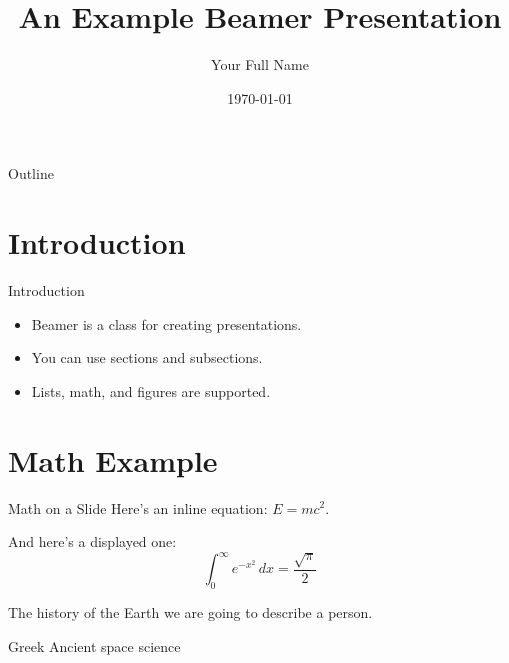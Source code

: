 \documentclass{beamer}
\title[Short Title]{An Example Beamer Presentation}
\author[Your Name]{Your Full Name}
\institute[Your School]{Pierre Elliott Trudeau High School}
\date{\today}
\begin{document}
\begin{frame}
  \titlepage
\end{frame}

\begin{frame}{Outline}
  \tableofcontents
\end{frame}

\section{Introduction}
\begin{frame}{Introduction}
  \begin{itemize}
    \item Beamer is a class for creating presentations.
    \item You can use sections and subsections.
    \item Lists, math, and figures are supported.
  \end{itemize}
\end{frame}

\section{Math Example}
\begin{frame}{Math on a Slide}
  Here’s an inline equation: $E = mc^2$.

  \vspace{1em}

  And here’s a displayed one:
  \[
    \int_{0}^{\infty} e^{-x^2} \, dx = \frac{\sqrt{\pi}}{2}
  \]
\end{frame}

\begin{frame}{The history of the Earth}
    we are going to describe a person. 
    \begin{center}
        
    \end{center}
\end{frame}

\begin{frame}{Greek Ancient space science}
  
\end{frame}
\end{document}
